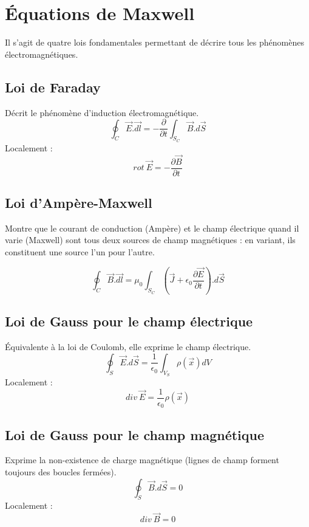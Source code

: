 \documentclass	[11pt, a4paper, openany]{book}
\begin{document}
	\section{Équations de Maxwell}
	Il s'agit de quatre lois fondamentales permettant de décrire tous les phénomènes électromagnétiques.
	
	\subsection{Loi de Faraday}
	Décrit le phénomène d'induction électromagnétique.
	\begin{equation}
		\oint_C \vec{E}.\vec{dl} = -\frac{\partial}{\partial t} \int_{S_C} \vec{B}.d\vec{S}
	\end{equation}
	Localement :
	\begin{equation}
		rot\ \vec{E} = -\frac{\partial\vec{B}}{\partial t}
	\end{equation}
	
	\subsection{Loi d'Ampère-Maxwell}
	Montre que le courant de conduction (Ampère) et le champ électrique quand il varie (Maxwell) sont tous deux sources de champ magnétiques : en variant, ils constituent une source l'un pour l'autre.
	
	\begin{equation}
		\oint_C \vec{B}.\vec{dl} = \mu_0   \int_{S_C}\left(\vec{J} + \epsilon_0 \frac{\partial \vec{E}}{\partial t}\right).d\vec{S}
	\end{equation}
	
	\subsection{Loi de Gauss pour le champ électrique}
	Équivalente à la loi de Coulomb, elle exprime le champ électrique.
	\begin{equation}
		\oint_S \vec{E}.d\vec{S} = \frac{1}{\epsilon_0}\int_{V_S} \rho(\vec{x})dV
	\end{equation}
	Localement :
	\begin{equation}
		div\ \vec{E} = \frac{1}{\epsilon_0}\rho(\vec{x})
	\end{equation}
	
	\subsection{Loi de Gauss pour le champ magnétique}
	Exprime la non-existence de charge magnétique (lignes de champ forment toujours des boucles fermées).
	\begin{equation}
		\oint_S \vec{B}.d\vec{S} = 0
	\end{equation}
	Localement :
	\begin{equation}
		div\ \vec{B} = 0
	\end{equation}
	
\end{document}
